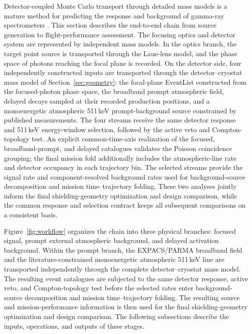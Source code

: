 \documentclass[11pt]{article}
\begin{document}
Detector-coupled Monte Carlo transport through detailed mass models is a mature method for predicting the response and background of gamma-ray spectrometers \cite{Sturner2003}. This section describes the end-to-end chain from source generation to flight-performance assessment. The focusing optics and detector system are represented by independent mass models. In the optics branch, the target point source is transported through the Laue-lens model, and the phase space of photons reaching the focal plane is recorded. On the detector side, four independently constructed inputs are transported through the detector--cryostat mass model of Section~\ref{sec:geometry}: the focal-plane EventList constructed from the focused-photon phase space, the broadband prompt atmospheric field, delayed decays sampled at their recorded production positions, and a monoenergetic atmospheric 511\,keV prompt-background source constrained by published measurements. The four streams receive the same detector response and 511\,keV energy-window selection, followed by the active veto and Compton-topology test. An explicit common-time-axis realization of the focused, broadband-prompt, and delayed catalogues validates the Poisson coincidence grouping; the final mission fold additionally includes the atmospheric-line rate and detector occupancy in each trajectory bin. The selected streams provide the signal rate and component-resolved background rates used for background-source decomposition and mission time--trajectory folding. These two analyses jointly inform the final shielding-geometry optimization and design comparison, while the common response and selection contract keeps all subsequent comparisons on a consistent basis.

Figure~\ref{fig:workflow} organizes the chain into three physical branches: focused signal, prompt external atmospheric background, and delayed activation background. Within the prompt branch, the EXPACS/PARMA broadband field and the literature-constrained monoenergetic atmospheric 511\,keV line are transported independently through the complete detector--cryostat mass model. The resulting event catalogues are subjected to the same detector response, active veto, and Compton-topology test before the selected rates enter background-source decomposition and mission time--trajectory folding. The resulting source and mission-performance information is then used for the final shielding-geometry optimization and design comparison. The following subsections describe the inputs, operations, and outputs of these stages.
\end{document}
